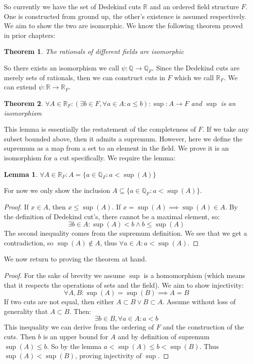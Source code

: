 \documentclass{article}
\newtheorem{thm}{Theorem}[section]
\newtheorem{lem}{Lemma}[section]
\begin{document}
\noindent So currently we have the set of Dedekind cuts $\mathbb{R}$ and an ordered field structure $F$. One is constructed from ground up, the other's existence is assumed respectively. We aim to show the two are isomorphic. We know the following theorem proved in prior chapters:
\begin{thm}
The rationals of different fields are isomorphic
\end{thm}
\noindent So there exists an isomorphism we call $\psi: \mathbb{Q} \xrightarrow{} \mathbb{Q}_F$. Since the Dedekind cuts are merely sets of rationals, then we can construct cuts in $F$ which we call $\mathbb{R}_F$. We can extend $\psi: \mathbb{R} \xrightarrow{} \mathbb{R}_F$.\\

\begin{thm}
    $\forall A \in \mathbb{R}_F: (\exists b \in F, \forall a \in A: a \leqslant b): \sup: A \xrightarrow{} F$ and $\sup$ is an isomorphism
\end{thm}
\noindent This lemma is essentially the restatement of the completeness of $F$. If we take any subset bounded above, then it admits a supremum. However, here we define the supremum as a map from a set to an element in the field. We prove it is an isomorphism for a cut specifically. We require the lemma:
\begin{lem}
    $\forall A \in \mathbb{R}_F: A = \{a \in \mathbb{Q}_F: a < \sup(A)\}$
\end{lem}
\noindent For now we only show the inclusion $A \subseteq \{a \in \mathbb{Q}_F: a < \sup(A)\}$.
\begin{proof}
If $x \in A$, then $x \leqslant \sup(A)$. If $x = \sup(A) \implies \sup(A) \in A$. By the definition of Dedekind cut's, there cannot be a maximal element, so:
\begin{equation*}
    \exists b \in A: \sup(A) < b \land b \leqslant \sup(A)
\end{equation*}
The second inequality comes from the supremum definition. We see that we get a contradiction, so $\sup(A) \notin A$, thus $\forall a \in A: a < \sup(A)$.
\end{proof}

\noindent We now return to proving the theorem at hand.
\begin{proof}
For the sake of brevity we assume $\sup$ is a homomorphism (which means that it respects the operations of sets and the field). We aim to show injectivity:
\begin{equation*}
    \forall A, B: \sup(A) = \sup(B) \implies A = B
\end{equation*}
If two cuts are not equal, then either $A \subset B \lor B \subset A$. Assume without loss of generality that $A \subset B$. Then:
\begin{equation*}
    \exists b \in B, \forall a \in A: a < b
\end{equation*}
This inequality we can derive from the ordering of $F$ and the construction of the cuts. Then $b$ is an upper bound for $A$ and by definition of supremum $\sup(A) \leqslant b$. So by the lemma $a < \sup(A) \leqslant b < \sup(B)$. Thus $\sup(A) < \sup(B)$, proving injectivity of $\sup$.
\end{proof}
\end{document}
